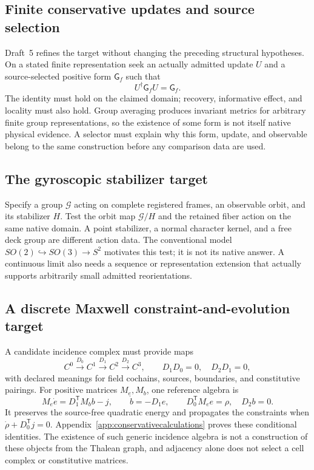 \subsection{Finite conservative updates and source selection}
Draft~5 refines the target without changing the preceding structural hypotheses. On a stated finite representation seek an actually admitted update $U$ and a source-selected positive form $\mathsf G_f$ such that
\[
U^\dagger\mathsf G_fU=\mathsf G_f.
\]
The identity must hold on the claimed domain; recovery, informative effect, and locality must also hold. Group averaging produces invariant metrics for arbitrary finite group representations, so the existence of some form is not itself native physical evidence. A selector must explain why this form, update, and observable belong to the same construction before any comparison data are used.

\subsection{The gyroscopic stabilizer target}
Specify a group $\mathcal G$ acting on complete registered frames, an observable orbit, and its stabilizer $H$. Test the orbit map $\mathcal G/H$ and the retained fiber action on the same native domain. A point stabilizer, a normal character kernel, and a free deck group are different action data. The conventional model $SO(2)\hookrightarrow SO(3)\to S^2$ motivates this test; it is not its native answer. A continuous limit also needs a sequence or representation extension that actually supports arbitrarily small admitted reorientations.

\subsection{A discrete Maxwell constraint-and-evolution target}
A candidate incidence complex must provide maps
\[
C^0\xrightarrow{D_0}C^1\xrightarrow{D_1}C^2\xrightarrow{D_2}C^3,
\qquad D_1D_0=0,\quad D_2D_1=0,
\]
with declared meanings for field cochains, sources, boundaries, and constitutive pairings. For positive matrices $M_e,M_b$, one reference algebra is
\[
M_e\dot e=D_1^{\mathsf T}M_b b-j,\qquad \dot b=-D_1e,
\qquad D_0^{\mathsf T}M_e e=\rho,\quad D_2b=0.
\]
It preserves the source-free quadratic energy and propagates the constraints when $\dot\rho+D_0^{\mathsf T}j=0$. Appendix~\ref{app:conservativecalculations} proves these conditional identities. The existence of such generic incidence algebra is not a construction of these objects from the Thalean graph, and adjacency alone does not select a cell complex or constitutive matrices.


